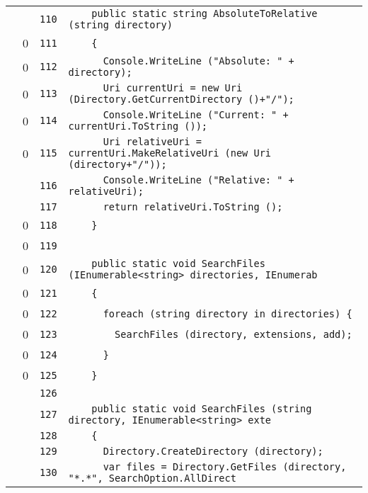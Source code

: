 \documentclass[a4paper,10pt]{article}
\begin{document}
\begin{longtable}[l]{lrrl}
\cellcolor{gray} &  & \verb~110~ & \verb~    public static string AbsoluteToRelative (string directory)~\\
\cellcolor{red} & 0 & \verb~111~ & \verb~    {~\\
\cellcolor{red} & 0 & \verb~112~ & \verb~      Console.WriteLine ("Absolute: " + directory);~\\
\cellcolor{red} & 0 & \verb~113~ & \verb~      Uri currentUri = new Uri (Directory.GetCurrentDirectory ()+"/");~\\
\cellcolor{red} & 0 & \verb~114~ & \verb~      Console.WriteLine ("Current: " + currentUri.ToString ());~\\
\cellcolor{red} & 0 & \verb~115~ & \verb~      Uri relativeUri = currentUri.MakeRelativeUri (new Uri (directory+"/"));~\\
\cellcolor{gray} &  & \verb~116~ & \verb~      Console.WriteLine ("Relative: " + relativeUri);~\\
\cellcolor{gray} &  & \verb~117~ & \verb~      return relativeUri.ToString ();~\\
\cellcolor{red} & 0 & \verb~118~ & \verb~    }~\\
\cellcolor{red} & 0 & \verb~119~ & \verb~~\\
\cellcolor{red} & 0 & \verb~120~ & \verb~    public static void SearchFiles (IEnumerable<string> directories, IEnumerab~\\
\cellcolor{red} & 0 & \verb~121~ & \verb~    {~\\
\cellcolor{red} & 0 & \verb~122~ & \verb~      foreach (string directory in directories) {~\\
\cellcolor{red} & 0 & \verb~123~ & \verb~        SearchFiles (directory, extensions, add);~\\
\cellcolor{red} & 0 & \verb~124~ & \verb~      }~\\
\cellcolor{red} & 0 & \verb~125~ & \verb~    }~\\
\cellcolor{gray} &  & \verb~126~ & \verb~~\\
\cellcolor{gray} &  & \verb~127~ & \verb~    public static void SearchFiles (string directory, IEnumerable<string> exte~\\
\cellcolor{gray} &  & \verb~128~ & \verb~    {~\\
\cellcolor{gray} &  & \verb~129~ & \verb~      Directory.CreateDirectory (directory);~\\
\cellcolor{gray} &  & \verb~130~ & \verb~      var files = Directory.GetFiles (directory, "*.*", SearchOption.AllDirect~\\

\end{longtable}
\end{document}
